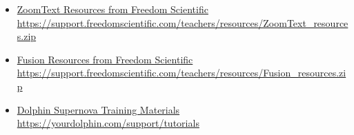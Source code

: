 \begin{itemize}[leftmargin=*]
\item \href{https://support.freedomscientific.com/teachers/resources/ZoomText_resources.zip}{ZoomText Resources from Freedom Scientific} \break\url{https://support.freedomscientific.com/teachers/resources/ZoomText_resources.zip}
\item \href{https://support.freedomscientific.com/teachers/resources/Fusion_resources.zip}{Fusion Resources from Freedom Scientific} \break\url{https://support.freedomscientific.com/teachers/resources/Fusion_resources.zip}
\item \href{https://yourdolphin.com/support/tutorials}{Dolphin Supernova Training Materials} \break\url{https://yourdolphin.com/support/tutorials}
\end{itemize}

